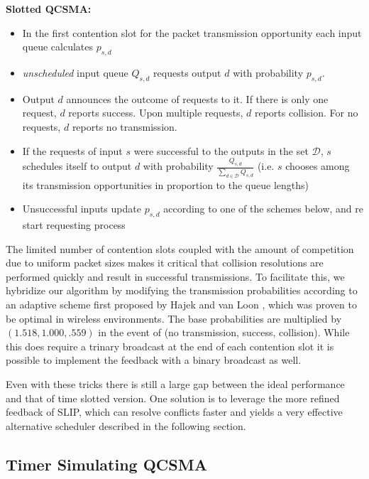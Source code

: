 \documentclass{IEEEtran}%
\begin{document}
{\bf Slotted QCSMA:}
\begin{itemize}
\item In the first contention slot for the packet transmission opportunity each input queue calculates $p_{s,d}$
\item {\it unscheduled} input queue $Q_{s,d}$ requests output $d$ with probability $p_{s,d}$.
\item Output $d$ announces the outcome of requests to it.  If there is only one request, $d$ reports success.  Upon multiple requests, $d$ reports collision. For no requests, $d$ reports no transmission.
\item If the requests of input $s$ were successful to the outputs in the set $\mathcal{D}$, $s$ schedules itself to output $d$ with probability $\frac{Q_{s,d}}{\sum_{d\in \mathcal{D}}Q_{s,d}}$ (i.e. $s$ chooses among its transmission opportunities in proportion to the queue lengths)
\item Unsuccessful inputs update $p_{s,d}$ according to one of the schemes below, and re start requesting process\\
\end{itemize}

The limited number of contention slots coupled with the amount of competition due to uniform packet sizes makes it critical that collision resolutions are performed quickly and result in successful transmissions.  To facilitate this, we hybridize our algorithm by modifying the transmission probabilities according to an adaptive scheme first proposed by Hajek and van Loon \cite{Hajek_van_Loon}, which was proven to be optimal in wireless environments.  The base probabilities are multiplied by $(1.518,1.000,.559)$  in the event of (no transmission, success, collision).  While this does require a trinary broadcast at the end of each contention slot it is possible to implement the feedback with a binary broadcast as well.

Even with these tricks there is still a large gap between the ideal performance and that of time slotted version.  One solution is to leverage the more refined feedback of SLIP, which can resolve conflicts faster and yields a very effective alternative scheduler described in the following section. 


\subsection{Timer Simulating QCSMA}
\end{document}
